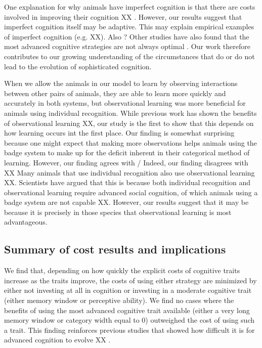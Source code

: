 One explanation for why animals have imperfect cognition is that there are costs involved in improving their cognition XX \cite{Gavrilets:2006fk}. However, our results suggest that imperfect cognition itself may be adaptive. This may explain empirical examples of imperfect cognition (e.g. \cite{Kikuchi:2010ys} XX). Also \cite{Stoddard:2011zr}?
Other studies have also found that the most advanced cognitive strategies are not always optimal \cite{Brush:2016kx,Kerr:2003vn,Dunlap:2009vn,Stephens:1991fk}. Our work therefore contributes to our growing understanding of the circumstances that do or do not lead to the evolution of sophisticated cognition.

When we allow the animals in our model to learn by observing interactions between other pairs of animals, they are able to learn more quickly and accurately in both systems, but observational learning was more beneficial for animals using individual recognition. While previous work has shown the benefits of observational learning XX, our study is the first to show that this depends on how learning occurs int the first place. Our finding is somewhat surprising because one might expect that making more observations helps animals using the badge system to make up for the deficit inherent in their categorical method of learning. However, our finding agrees with / Indeed, our finding disagrees with XX Many animals that use individual recognition also use observational learning XX. Scientists have argued that this is because both individual recognition and observational learning require advanced social cognition, of which animals using a badge system are not capable XX. However, our results suggest that it may be because it is precisely in those species that observational learning is most advantageous.

\subsection*{Summary of cost results and implications} %
We find that, depending on how quickly the explicit costs of cognitive traits increase as the traits improve, the costs of using either strategy are minimized by either not investing at all in cognition or investing in a moderate cognitive trait (either memory window or perceptive ability). We find no cases where the benefits of using the most advanced cognitive trait available (either a very long memory window or category width equal to $0$) outweighed the cost of using such a trait. This finding reinforces previous studies that showed how difficult it is for advanced cognition to evolve XX \cite{Kerr:2003vn}.



